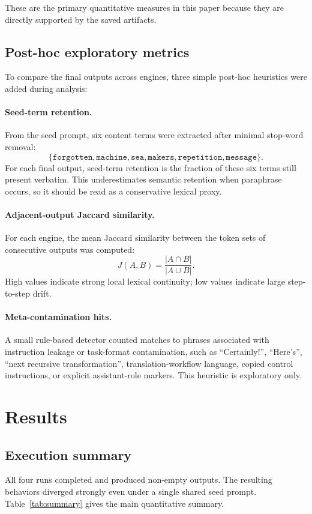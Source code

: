 \documentclass[11pt]{article}
\begin{document}
These are the primary quantitative measures in this paper because they are directly supported by the saved artifacts.

\subsection{Post-hoc exploratory metrics}
To compare the final outputs across engines, three simple post-hoc heuristics were added during analysis:

\paragraph{Seed-term retention.}
From the seed prompt, six content terms were extracted after minimal stop-word removal:
\[
\{\texttt{forgotten}, \texttt{machine}, \texttt{sea}, \texttt{makers}, \texttt{repetition}, \texttt{message}\}.
\]
For each final output, seed-term retention is the fraction of these six terms still present verbatim. This underestimates semantic retention when paraphrase occurs, so it should be read as a conservative lexical proxy.

\paragraph{Adjacent-output Jaccard similarity.}
For each engine, the mean Jaccard similarity between the token sets of consecutive outputs was computed:
\[
J(A,B)=\frac{|A \cap B|}{|A \cup B|}.
\]
High values indicate strong local lexical continuity; low values indicate large step-to-step drift.

\paragraph{Meta-contamination hits.}
A small rule-based detector counted matches to phrases associated with instruction leakage or task-format contamination, such as ``Certainly!'', ``Here's'', ``next recursive transformation'', translation-workflow language, copied control instructions, or explicit assistant-role markers. This heuristic is exploratory only.

\section{Results}

\subsection{Execution summary}
All four runs completed and produced non-empty outputs. The resulting behaviors diverged strongly even under a single shared seed prompt. Table~\ref{tab:summary} gives the main quantitative summary.
\end{document}
